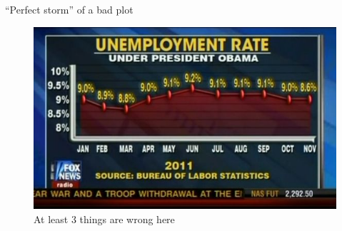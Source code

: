 \documentclass[12pt,english,pdf,dvipsnames,handout]{beamer}
\begin{document}
\begin{frame}{``Perfect storm'' of a bad plot}

\begin{figure}
	\centering
	\includegraphics[scale=0.5]{../04-graphs/24_Fox_unemployment}
	\caption{At least 3 things are wrong here}
\end{figure}

\end{frame}
\end{document}
